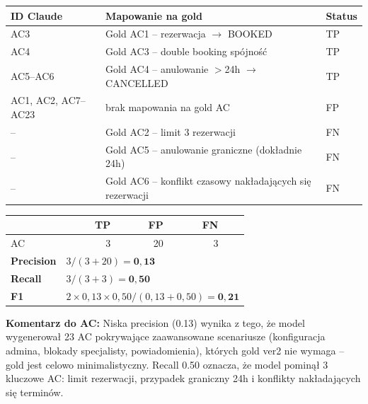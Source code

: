 \documentclass[12pt,a4paper]{article}
\newcommand{\tp}[1]{\colorbox{tpcolor}{\small #1}}
\newcommand{\fp}[1]{\colorbox{fpcolor}{\small #1}}
\newcommand{\fn}[1]{\colorbox{fncolor}{\small #1}}
\begin{document}
\begin{tabular}{p{2.5cm} p{7cm} l}
\toprule
\textbf{ID Claude} & \textbf{Mapowanie na gold} & \textbf{Status} \\
\midrule
AC3 & Gold AC1 -- rezerwacja $\rightarrow$ BOOKED & \tp{TP} \\
AC4 & Gold AC3 -- double booking spójność & \tp{TP} \\
AC5--AC6 & Gold AC4 -- anulowanie $>$24h $\rightarrow$ CANCELLED & \tp{TP} \\
AC1, AC2, AC7--AC23 & brak mapowania na gold AC & \fp{FP} \\
\midrule
-- & Gold AC2 -- limit 3 rezerwacji & \fn{FN} \\
-- & Gold AC5 -- anulowanie graniczne (dokładnie 24h) & \fn{FN} \\
-- & Gold AC6 -- konflikt czasowy nakładających się rezerwacji & \fn{FN} \\
\bottomrule
\end{tabular}

\vspace{0.5em}
\begin{tabular}{lrrrr}
\toprule
& \textbf{TP} & \textbf{FP} & \textbf{FN} & \\
\midrule
AC & 3 & 20 & 3 & \\
\midrule
\textbf{Precision} & \multicolumn{4}{l}{$3 / (3+20) = \mathbf{0{,}13}$} \\
\textbf{Recall}    & \multicolumn{4}{l}{$3 / (3+3) = \mathbf{0{,}50}$} \\
\textbf{F1}        & \multicolumn{4}{l}{$2 \times 0{,}13 \times 0{,}50 / (0{,}13+0{,}50) = \mathbf{0{,}21}$} \\
\bottomrule
\end{tabular}

\vspace{0.5em}
\begin{mdframed}[backgroundcolor=metabg, linewidth=0pt, innerleftmargin=10pt, innerrightmargin=10pt, innertopmargin=6pt, innerbottommargin=6pt]
\small\textbf{Komentarz do AC:} Niska precision (0.13) wynika z tego, że model wygenerował 23 AC pokrywające zaawansowane scenariusze (konfiguracja admina, blokady specjalisty, powiadomienia), których gold ver2 nie wymaga -- gold jest celowo minimalistyczny. Recall 0.50 oznacza, że model pominął 3 kluczowe AC: limit rezerwacji, przypadek graniczny 24h i konflikty nakładających się terminów.
\end{mdframed}

\end{document}
